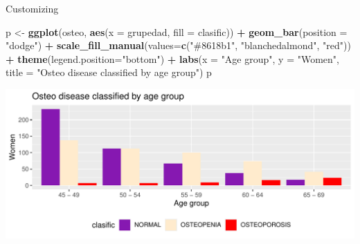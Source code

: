 \documentclass[
  ignorenonframetext,
]{beamer}
\newenvironment{Shaded}{\begin{snugshade}}{\end{snugshade}}
\newcommand{\AttributeTok}[1]{\textcolor[rgb]{0.13,0.29,0.53}{#1}}
\newcommand{\FunctionTok}[1]{\textcolor[rgb]{0.13,0.29,0.53}{\textbf{#1}}}
\newcommand{\NormalTok}[1]{#1}
\newcommand{\OtherTok}[1]{\textcolor[rgb]{0.56,0.35,0.01}{#1}}
\newcommand{\SpecialCharTok}[1]{\textcolor[rgb]{0.81,0.36,0.00}{\textbf{#1}}}
\newcommand{\StringTok}[1]{\textcolor[rgb]{0.31,0.60,0.02}{#1}}
\begin{document}
\begin{frame}[fragile]{Customizing}
\label{customizing}
\begin{Shaded}
\begin{Highlighting}[]
\NormalTok{p }\OtherTok{\textless{}{-}} \FunctionTok{ggplot}\NormalTok{(osteo, }\FunctionTok{aes}\NormalTok{(}\AttributeTok{x =}\NormalTok{ grupedad, }\AttributeTok{fill =}\NormalTok{ clasific)) }\SpecialCharTok{+}
  \FunctionTok{geom\_bar}\NormalTok{(}\AttributeTok{position =} \StringTok{"dodge"}\NormalTok{) }\SpecialCharTok{+}
  \FunctionTok{scale\_fill\_manual}\NormalTok{(}\AttributeTok{values=}\FunctionTok{c}\NormalTok{(}\StringTok{"\#8618b1"}\NormalTok{, }\StringTok{"blanchedalmond"}\NormalTok{, }\StringTok{"red"}\NormalTok{)) }\SpecialCharTok{+}
  \FunctionTok{theme}\NormalTok{(}\AttributeTok{legend.position=}\StringTok{"bottom"}\NormalTok{) }\SpecialCharTok{+}
  \FunctionTok{labs}\NormalTok{(}\AttributeTok{x =} \StringTok{"Age group"}\NormalTok{, }\AttributeTok{y =} \StringTok{"Women"}\NormalTok{, }\AttributeTok{title =} \StringTok{"Osteo disease classified by age group"}\NormalTok{)}
\NormalTok{p}
\end{Highlighting}
\end{Shaded}

\includegraphics{StatisticsWithR-3-Exploratory_Analysis_II_And_Graphics_files/figure-beamer/unnamed-chunk-10-1.pdf}
\end{frame}
\end{document}
